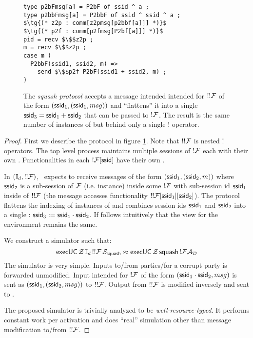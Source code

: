 \begin{figure}
\begin{lstlisting}[basicstyle=\small\BeraMonottFamily, mathescape, frame=single]
type p2bFmsg[a] = P2bF of ssid ^ a ;
type p2bbFmsg[a] = P2bbF of ssid ^ ssid ^ a ;
$\tg{(* z2p : comm[z2pmsg[p2bbf[a]]] *)}$
$\tg{(* p2f : comm[p2fmsg[P2bf[a]]] *)}$
pid = recv $\$$z2p ;
m = recv $\$$z2p ;
case m (
  P2bbF(ssid1, ssid2, m) =>
    send $\$$p2f P2bF(ssid1 + ssid2, m) ;
)
\end{lstlisting}
\caption{The \textit{squash protocol} accepts a message intended intended for $!!\mathcal{F}$ of the form $({\mathsf {ssid}}_1, ({\mathsf {ssid}}_1, msg))$ and ``flattens'' it into a single ${\mathsf {ssid}}_3 = {\mathsf {ssid}}_1 + {\mathsf {ssid}}_2$ that can be passed to $!\mathcal{F}$. The result is the same number of instances of \F but behind only a single $!$ operator.}
\label{fig:squash}
\end{figure}

\begin{proof}
First we describe the  protocol in figure \ref{fig:squash}.
Note that $!!\mathcal{F}$ is nested $!$ operators. The top level process maintains multiple sessions of $!\mathcal{F}$ each with their own .
Functionalities in each $!\mathcal{F}[{\mathsf {ssid}}]$ have their own . 

In $(\mathbb{I}_d, !!\mathcal{F})$, \idealP~expects to receive messages of the form $({\mathsf {ssid}}_1, ({\mathsf {ssid}}_2, m))$ where ${\mathsf {ssid_2}}$ is a sub-session of $\mathcal{F}$ (i.e. instance) inside some $!\mathcal{F}$ with sub-session id ${\mathsf {ssid}}_1$ inside of $!!\mathcal{F}$ (the message accesses functionality $!!\mathcal{F}[{\mathsf {ssid}}_1][{\mathsf {ssid}}_2]$).
The  protocol flattens the indexing of instances of \F and combines session ids ${\mathsf {ssid}}_1$ and ${\mathsf {ssid}}_2$ into a single : ${\mathsf {ssid}}_3 := {\mathsf {ssid}}_1 \cdot {\mathsf {ssid}}_2$.
If follows intuitively that the view for the environment remains the same. 

We construct a simulator such that:
\[
{\mathsf {execUC}} \, \mathcal{Z} \, \mathbb{I}_d \, !!\mathcal{F} \, \mathcal{S}_{{\mathsf {squash}}} \approx {\mathsf {execUC}} \, \mathcal{Z} \, {\mathsf {squash}} \, !\mathcal{F} \mathcal{A}_\mathcal{D} 
\]
The simulator is very simple. 
Inputs to/from parties/\Z for a corrupt party is forwarded unmodified.
Input intended for $!\mathcal{F}$ of the form $({\mathsf {ssid}}_1 \cdot {\mathsf {ssid}}_2, msg)$ is sent as $({\mathsf {ssid}}_1, ({\mathsf {ssid}}_2, msg))$ to $!!\mathcal{F}$. 
Output from $!!\mathcal{F}$ is modified inversely and sent to \Z.

The proposed simulator is trivially analyzed to be \textit{well-resource-typed}.
It performs constant work per activation and does ``real'' simulation other than message modification to/from $!!\mathcal{F}$.

\end{proof}

